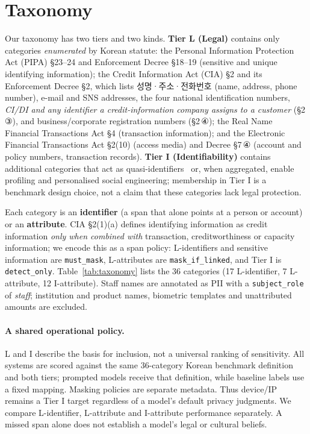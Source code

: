 \section{Taxonomy}
\label{sec:taxonomy}

Our taxonomy has two tiers and two kinds. \textbf{Tier L (Legal)} contains only categories \emph{enumerated} by Korean statute: the Personal Information Protection Act (PIPA) \S23--24 and Enforcement Decree \S18--19 (sensitive and unique identifying information); the Credit Information Act (CIA) \S2 and its Enforcement Decree \S2, which lists 성명·주소·전화번호 (name, address, phone number), e-mail and SNS addresses, the four national identification numbers, \emph{CI/DI and any identifier a credit-information company assigns to a customer} (\S2\,③), and business/corporate registration numbers (\S2\,④); the Real Name Financial Transactions Act \S4 (transaction information); and the Electronic Financial Transactions Act \S2(10) (access media) and Decree \S7\,④ (account and policy numbers, transaction records). \textbf{Tier I (Identifiability)} contains additional categories that act as quasi-identifiers~\cite{pilan2022tab} or, when aggregated, enable profiling and personalised social engineering; membership in Tier I is a benchmark design choice, not a claim that these categories lack legal protection.

Each category is an \textbf{identifier} (a span that alone points at a person or account) or an \textbf{attribute}. CIA \S2(1)(a) defines identifying information as credit information \emph{only when combined with} transaction, creditworthiness or capacity information; we encode this as a span policy: L-identifiers and sensitive information are \nolinkurl{must_mask}, L-attributes are \nolinkurl{mask_if_linked}, and Tier I is \nolinkurl{detect_only}. Table~\ref{tab:taxonomy} lists the 36 categories (17 L-identifier, 7 L-attribute, 12 I-attribute). Staff names are annotated as PII with a \nolinkurl{subject_role} of \emph{staff}; institution and product names, biometric templates and unattributed amounts are excluded.

\paragraph{A shared operational policy.}
L and I describe the basis for inclusion, not a universal ranking of sensitivity. All systems are scored against the same 36-category Korean benchmark definition and both tiers; prompted models receive that definition, while baseline labels use a fixed mapping. Masking policies are separate metadata. Thus device/IP remains a Tier I target regardless of a model's default privacy judgments. We compare L-identifier, L-attribute and I-attribute performance separately. A missed span alone does not establish a model's legal or cultural beliefs.

